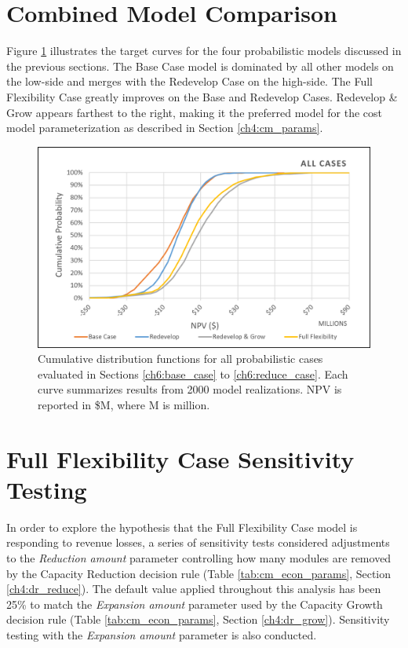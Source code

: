 \section{Combined Model Comparison}
Figure \ref{fig:all_case_cdf} illustrates the target curves for the four probabilistic models discussed in the previous sections. The Base Case model is dominated by all other models on the low-side and merges with the Redevelop Case on the high-side. The Full Flexibility Case greatly improves on the Base and Redevelop Cases. Redevelop \& Grow appears farthest to the right, making it the preferred model for the cost model parameterization as described in Section \ref{ch4:cm_params}. 

\begin{figure}[!htp]
\centering
\includegraphics[width=.85\textwidth]{templates/images/Figure-All_Case_CDF.png}
\caption[All Cases CDF]{Cumulative distribution functions for all probabilistic cases evaluated in Sections \ref{ch6:base_case} to \ref{ch6:reduce_case}. Each curve summarizes results from 2000 model realizations. NPV is reported in \$M, where M is million.}
\label{fig:all_case_cdf}
\end{figure}

\section{Full Flexibility Case Sensitivity Testing}\label{ch6:sensitivity}
In order to explore the hypothesis that the Full Flexibility Case model is responding to revenue losses, a series of sensitivity tests considered adjustments to the \textit{Reduction amount} parameter controlling how many modules are removed by the Capacity Reduction decision rule (Table \ref{tab:cm_econ_params}, Section \ref{ch4:dr_reduce}). The default value applied throughout this analysis has been 25\% to match the \textit{Expansion amount} parameter used by the Capacity Growth decision rule (Table \ref{tab:cm_econ_params}, Section \ref{ch4:dr_grow}). Sensitivity testing with the \textit{Expansion amount} parameter is also conducted.

